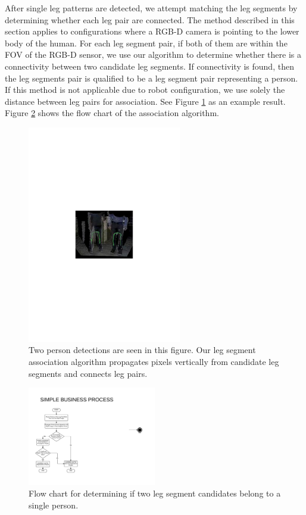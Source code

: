 After single leg patterns are detected, we attempt matching the leg segments by determining whether each leg pair are connected. The method described in this section applies to configurations where a RGB-D camera is pointing to the lower body of the human. For each leg segment pair, if both of them are within the FOV of the RGB-D sensor, we use our algorithm to determine whether there is a connectivity between two candidate leg segments. If connectivity is found, then the leg segments pair is qualified to be a leg segment pair representing a person. If this method is not applicable due to robot configuration, we use solely the distance between leg pairs for association. See Figure \ref{fig:leg_connectivity} as an example result. Figure \ref{fig:leg_connectivity_diagram} shows the flow chart of the association algorithm.

\begin{figure}[ht!]
\centering
\includegraphics[width=0.6\textwidth]{pics/leg_connectivity}
\caption{Two person detections are seen in this figure. Our leg segment association algorithm propagates pixels vertically from candidate leg segments and connects leg pairs.}
\label{fig:leg_connectivity}
\end{figure}

\begin{figure}[ht!]
\centering
\includegraphics[width=0.5\textwidth]{pics/leg_connectivity_diagram}
\caption{Flow chart for determining if two leg segment candidates belong to a single person.}
\label{fig:leg_connectivity_diagram}
\end{figure}

